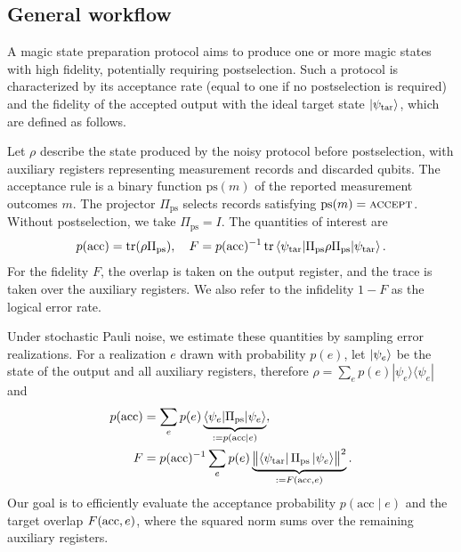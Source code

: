 \documentclass[aps,prx,twocolumn,superscriptaddress,longbibliography]{revtex4-2}
\newcommand{\ketbra}[2]{|#1\rangle\!\langle#2|}
\begin{document}
\subsection{General workflow}\label{sec:workflow}

A magic state preparation protocol aims to produce one or more magic states
with high fidelity, potentially requiring postselection.
Such a protocol is characterized by
its acceptance rate (equal to one if no postselection is required)
and the fidelity of the accepted output with the ideal target state $\ket{\psi_{\text{tar}}}$,
which are defined as follows.

Let $\rho$ describe the state produced by the noisy protocol before postselection,
with auxiliary registers representing measurement records and discarded qubits.
The acceptance rule is a binary function $\mathrm{ps}(m)$ of the reported measurement outcomes $m$.
The projector $\Pi_{\text{ps}}$ selects records satisfying $\mathrm{ps}(m)=\textsc{accept}$.
Without postselection, we take $\Pi_{\text{ps}}=I$.
The quantities of interest are
\begin{equation}
      p(\text{acc})=\operatorname{tr}(\rho\Pi_{\text{ps}}),\quad
      F=p(\text{acc})^{-1}\operatorname{tr}\braket{\psi_{\text{tar}}|\Pi_{\text{ps}}\rho\Pi_{\text{ps}}|\psi_{\text{tar}}}.
      \label{eq:required-output}
\end{equation}
For the fidelity $F$, the overlap is taken on the output register,
and the trace is taken over the auxiliary registers.
We also refer to the infidelity $1-F$ as the logical error rate.

Under stochastic Pauli noise, we estimate these quantities by sampling error realizations.
For a realization $e$ drawn with probability $p(e)$,
let $\ket{\psi_e}$ be the state of the output and all auxiliary registers,
therefore $\rho=\sum_e p(e)\ketbra{\psi_e}{\psi_e}$ and 
\begin{align}
      p(\text{acc})&=\sum_e p(e)\underbrace{\braket{\psi_e|\Pi_{\text{ps}}|\psi_e}}_{:=p({\rm acc}\mid e)},
      \label{eq:acc-from-sample}\\
      F&=p(\text{acc})^{-1}\sum_e p(e)
      \underbrace{
      \bigl\|\bra{\psi_{\text{tar}}}\Pi_{\text{ps}}\ket{\psi_e}\bigr\|^2}_{:=F({\rm acc},e)}.
      \label{eq:F-from-sample}
\end{align}
Our goal is to efficiently evaluate the acceptance probability $p(\text{acc}\mid e)$ and the target overlap $F({\rm acc},e)$, where 
the squared norm sums over the remaining auxiliary registers.
\end{document}

